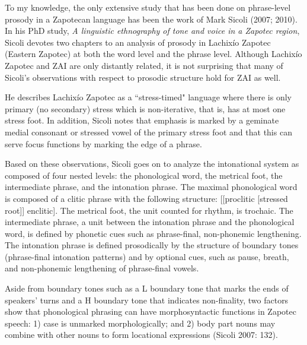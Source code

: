 To my knowledge, the only extensive study that has been done on phrase-level prosody in a Zapotecan language has been the work of Mark Sicoli (2007; 2010). In his PhD study, \textit{A linguistic ethnography of tone and voice in a Zapotec region}, Sicoli devotes two chapters to an analysis of prosody in Lachix\'{i}o Zapotec (Eastern Zapotec) at both the word level and the phrase level. Although Lachix\'{i}o Zapotec and ZAI are only distantly related, it is not surprising that many of Sicoli's observations with respect to prosodic structure hold for ZAI as well. 

He describes Lachix\'{i}o Zapotec as a ``stress-timed" language where there is only primary (no secondary) stress which is non-iterative, that is, has at most one stress foot. In addition, Sicoli notes that emphasis is marked by a geminate medial consonant or stressed vowel of the primary stress foot and that this can serve focus functions by marking the edge of a phrase. 

Based on these observations, Sicoli goes on to analyze the intonational system as composed of four nested levels: the phonological word, the metrical foot, the intermediate phrase, and the intonation phrase. The maximal phonological word is composed of a clitic phrase with the following structure: [[proclitic [stressed root]] enclitic]. The metrical foot, the unit counted for rhythm, is trochaic. The intermediate phrase, a unit between the intonation phrase and the phonological word, is defined by phonetic cues such as phrase-final, non-phonemic lengthening. The intonation phrase is defined prosodically by the structure of boundary tones (phrase-final intonation patterns) and by optional cues, such as pause, breath, and non-phonemic lengthening of phrase-final vowels. 

Aside from boundary tones such as a L boundary tone that marks the ends of speakers' turns and a H boundary tone that indicates non-finality, two factors show that phonological phrasing can have morphosyntactic functions in Zapotec speech: 1) case is unmarked morphologically; and 2) body part nouns may combine with other nouns to form locational expressions (Sicoli 2007: 132).

